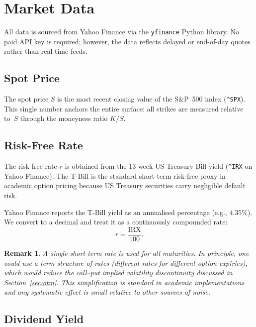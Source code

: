 \documentclass[12pt, a4paper]{article}
\newtheorem{remark}{Remark}
\begin{document}
\section{Market Data}
\label{sec:data}

All data is sourced from Yahoo Finance via the \texttt{yfinance} Python library.
No paid API key is required; however, the data reflects delayed or end-of-day
quotes rather than real-time feeds.

\subsection{Spot Price}

The spot price $S$ is the most recent closing value of the S\&P~500 index
(\texttt{\^{}SPX}). This single number anchors the entire surface: all strikes
are measured relative to~$S$ through the moneyness ratio $K/S$.

\subsection{Risk-Free Rate}

The risk-free rate $r$ is obtained from the 13-week US Treasury Bill yield
(\texttt{\^{}IRX} on Yahoo Finance). The T-Bill is the standard short-term
risk-free proxy in academic option pricing because US Treasury securities carry
negligible default risk.

Yahoo Finance reports the T-Bill yield as an annualised percentage (e.g.,
$4.35\%$). We convert to a decimal and treat it as a continuously compounded
rate:
\begin{equation}
    r = \frac{\text{IRX}}{100}.
    \label{eq:rate}
\end{equation}

\begin{remark}
A single short-term rate is used for all maturities. In principle, one could use
a term structure of rates (different rates for different option expiries), which
would reduce the call--put implied volatility discontinuity discussed in
Section~\ref{sec:otm}. This simplification is standard in academic
implementations and any systematic effect is small relative to other sources of
noise.
\end{remark}

\subsection{Dividend Yield}
\end{document}
